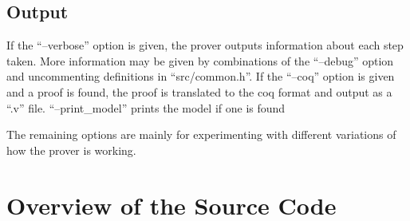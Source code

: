 \documentclass{report}
\begin{document}
\subsection{Output}
If the ``--verbose'' option is given, the prover outputs information about each step taken. More information may be given by combinations of the ``--debug'' option and uncommenting definitions in ``src/common.h''. 
If the ``--coq'' option is given and a proof is found, the proof is translated to the coq format and output as a ``.v'' file. ``--print_model'' prints the model if one is found

The remaining options are mainly for experimenting with different variations of how the prover is working. 
\section{Overview of the Source Code}
\end{document}
